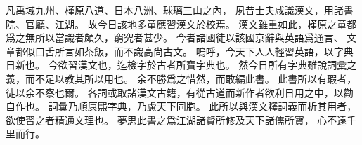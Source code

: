 凡禹域九州、槿原八道、日本八洲、球璃三山之內，
夙昔士夫咸識漢文，用諸書院、官廳、江湖。
故今日該地多童應習漢文於校焉。
漢文雖重如此，槿原之童都爲之無所以當識者頗久，窮究者甚少。
今者諸國徒以該國京辭與英語爲通言、
文章都似口舌所言如茶飯，而不識高尙古文。
嗚呼，今天下人人輕習英語，以字典日新也。
今欲習漢文也，迄檢字於古者所寶字典也。
然今日所有字典雖說詞彙之義，而不足以教其所以用也。
余不勝爲之惜然，而敢編此書。
此書所以有瑕者，徒以余不察也爾。
各詞或取諸漢文古籍，有從古道而新作者欲利日用之中，以勸自作也。
詞彙乃順康熙字典，乃慮天下同胞。
此所以與漢文釋詞義而析其用者，欲使習之者精通文理也。
夢思此書之爲江湖諸賢所修及天下諸儒所寶，
心不遠千里而行。
